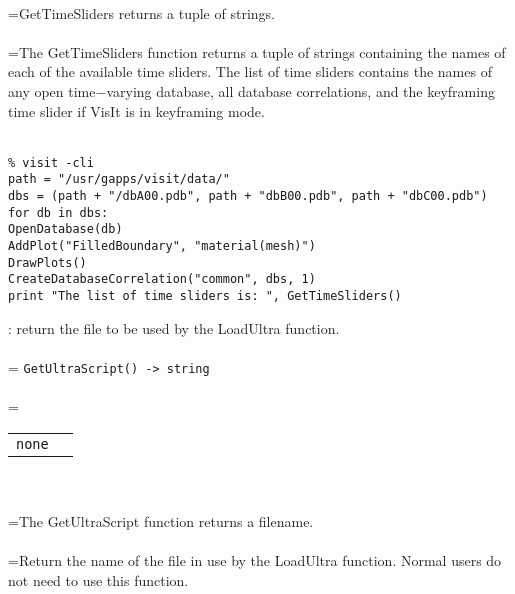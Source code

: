 \documentclass[10pt,a4paper]{report}
\begin{document}
 \\ 
\hangindent=\parindent GetTimeSliders returns a tuple of strings. \\[-3mm] 

 \\ 
\hangindent=\parindent The GetTimeSliders function returns a tuple of strings containing the names of each of the available time sliders. The list of time sliders contains the names of any open time$-$varying database, all database correlations, and the keyframing time slider if VisIt is in keyframing mode. \\[-3mm] 

\\[-6mm]
\begin{verbatim}% visit -cli
path = "/usr/gapps/visit/data/"
dbs = (path + "/dbA00.pdb", path + "dbB00.pdb", path + "dbC00.pdb")
for db in dbs:
OpenDatabase(db)
AddPlot("FilledBoundary", "material(mesh)")
DrawPlots()
CreateDatabaseCorrelation("common", dbs, 1)
print "The list of time sliders is: ", GetTimeSliders()
\end{verbatim}
\newpage


{}
: return the file to be used by the LoadUltra function.\\[-3mm]

 \\ 
\hangindent=\parindent 
\verb!GetUltraScript() -> string!\\ [-3mm]

 \\ 
\hangindent=\parindent 
\begin{tabular}{ll}
\verb!none! &  \\
\end{tabular} \\[-2mm]


 \\ 
\hangindent=\parindent The GetUltraScript function returns a filename. \\[-3mm] 

 \\ 
\hangindent=\parindent Return the name of the file in use by the LoadUltra function. Normal users do not need to use this function. \\[-3mm] 

\newpage
\end{document}
